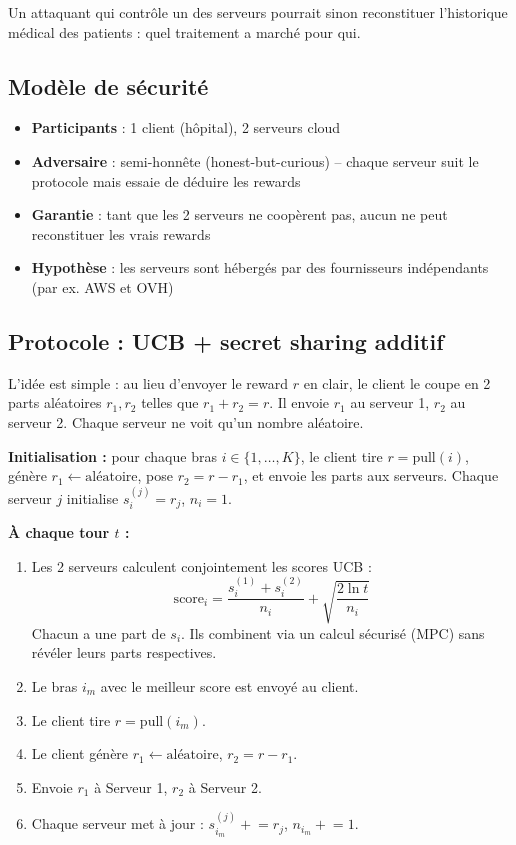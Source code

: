 \documentclass[12pt,a4paper]{article}
\begin{document}
Un attaquant qui contrôle un des serveurs pourrait sinon reconstituer l'historique médical des patients : quel traitement a marché pour qui.

\subsection{Modèle de sécurité}

\begin{itemize}
    \item \textbf{Participants} : 1 client (hôpital), 2 serveurs cloud
    \item \textbf{Adversaire} : semi-honnête (honest-but-curious) -- chaque serveur suit le protocole mais essaie de déduire les rewards
    \item \textbf{Garantie} : tant que les 2 serveurs ne coopèrent pas, aucun ne peut reconstituer les vrais rewards
    \item \textbf{Hypothèse} : les serveurs sont hébergés par des fournisseurs indépendants (par ex. AWS et OVH)
\end{itemize}

\subsection{Protocole : UCB + secret sharing additif}

L'idée est simple : au lieu d'envoyer le reward $r$ en clair, le client le coupe en 2 parts aléatoires $r_1, r_2$ telles que $r_1 + r_2 = r$. Il envoie $r_1$ au serveur 1, $r_2$ au serveur 2. Chaque serveur ne voit qu'un nombre aléatoire.

\textbf{Initialisation :} pour chaque bras $i \in \{1, \ldots, K\}$, le client tire $r = \text{pull}(i)$, génère $r_1 \leftarrow \text{aléatoire}$, pose $r_2 = r - r_1$, et envoie les parts aux serveurs. Chaque serveur $j$ initialise $s^{(j)}_i = r_j$, $n_i = 1$.

\textbf{À chaque tour $t$ :}
\begin{enumerate}
    \item Les 2 serveurs calculent conjointement les scores UCB :
    $$\text{score}_i = \frac{s^{(1)}_i + s^{(2)}_i}{n_i} + \sqrt{\frac{2 \ln t}{n_i}}$$
    Chacun a une part de $s_i$. Ils combinent via un calcul sécurisé (MPC) sans révéler leurs parts respectives.
    \item Le bras $i_m$ avec le meilleur score est envoyé au client.
    \item Le client tire $r = \text{pull}(i_m)$.
    \item Le client génère $r_1 \leftarrow \text{aléatoire}$, $r_2 = r - r_1$.
    \item Envoie $r_1$ à Serveur 1, $r_2$ à Serveur 2.
    \item Chaque serveur met à jour : $s^{(j)}_{i_m} \mathrel{+}= r_j$, $n_{i_m} \mathrel{+}= 1$.
\end{enumerate}
\end{document}
